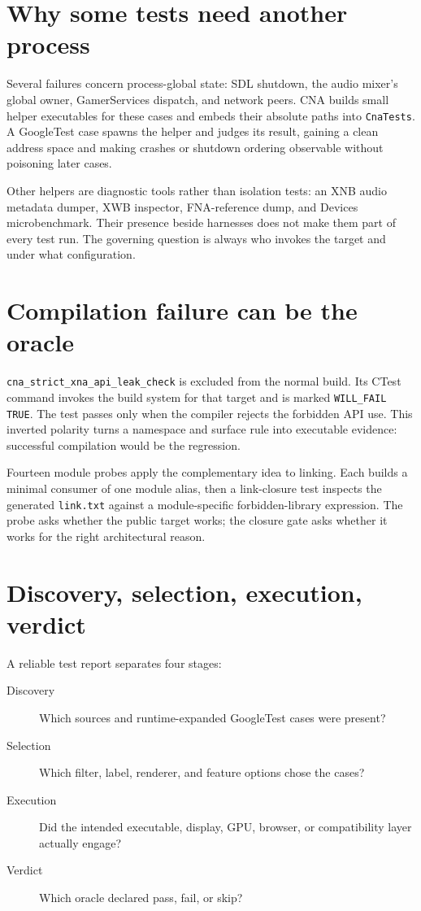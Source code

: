 \section{Why some tests need another process}

Several failures concern process-global state: SDL shutdown, the audio mixer's global owner,
GamerServices dispatch, and network peers.  CNA builds small helper executables for these cases
and embeds their absolute paths into \texttt{CnaTests}.  A GoogleTest case spawns the helper and
judges its result, gaining a clean address space and making crashes or shutdown ordering
observable without poisoning later cases.

Other helpers are diagnostic tools rather than isolation tests: an XNB audio metadata dumper,
XWB inspector, FNA-reference dump, and Devices microbenchmark.  Their presence beside harnesses
does not make them part of every test run.  The governing question is always who invokes the
target and under what configuration.

\section{Compilation failure can be the oracle}

\texttt{cna\_strict\_xna\_api\_leak\_check} is excluded from the normal build.  Its CTest command
invokes the build system for that target and is marked \texttt{WILL\_FAIL TRUE}.  The test passes
only when the compiler rejects the forbidden API use.  This inverted polarity turns a namespace
and surface rule into executable evidence: successful compilation would be the regression.

Fourteen module probes apply the complementary idea to linking.  Each builds a minimal consumer
of one module alias, then a link-closure test inspects the generated \texttt{link.txt} against a
module-specific forbidden-library expression.  The probe asks whether the public target works;
the closure gate asks whether it works for the right architectural reason.

\section{Discovery, selection, execution, verdict}

A reliable test report separates four stages:

\begin{description}
  \item[Discovery] Which sources and runtime-expanded GoogleTest cases were present?
  \item[Selection] Which filter, label, renderer, and feature options chose the cases?
  \item[Execution] Did the intended executable, display, GPU, browser, or compatibility layer
        actually engage?
  \item[Verdict] Which oracle declared pass, fail, or skip?
\end{description}

